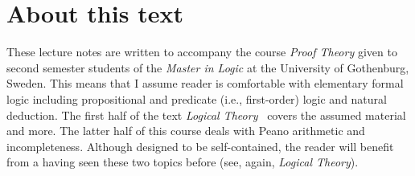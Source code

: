 \chapter{About this text}
\label{c-about}
%
These lecture notes are written to accompany the course \emph{Proof Theory} given to second semester students of the \emph{Master in Logic} at the University of Gothenburg, Sweden.
This means that I assume reader is comfortable with elementary formal logic including propositional and predicate (i.e., first-order) logic and natural deduction.
The first half of the text \emph{Logical Theory}~\cite{LogThe} covers the assumed material and more.
The latter half of this course deals with Peano arithmetic and incompleteness.
Although designed to be self-contained, the reader will benefit from a having seen these two topics before (see, again, \emph{Logical Theory}).
